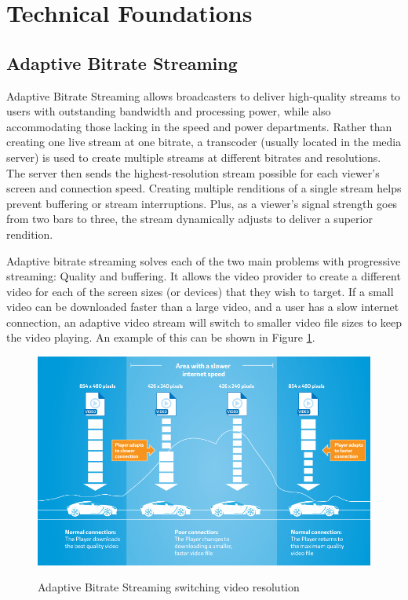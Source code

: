 \section{\textbf{Technical Foundations}}\label{sec:techfoundation}
\subsection{Adaptive Bitrate Streaming}

Adaptive Bitrate Streaming allows broadcasters to deliver high-quality streams to users with outstanding bandwidth and processing power, while also accommodating those lacking in the speed and power departments. Rather than creating one live stream at one bitrate, a transcoder (usually located in the media server) is used to create multiple streams at different bitrates and resolutions. The server then sends the highest-resolution stream possible for each viewer’s screen and connection speed. Creating multiple renditions of a single stream helps prevent buffering or stream interruptions. Plus, as a viewer’s signal strength goes from two bars to three, the stream dynamically adjusts to deliver a superior rendition. \cite{abs}

Adaptive bitrate streaming solves each of the two main problems with progressive streaming: Quality and buffering. It allows the video provider to create a different video for each of the screen sizes (or devices) that they wish to target. If a small video can be downloaded faster than a large video, and a user has a slow internet connection, an adaptive video stream will switch to smaller video file sizes to keep the video playing. An example of this can be shown in Figure \ref{fig:abs}.

\begin{figure}[!ht]
	\centering
\includegraphics[scale=0.29]{figures/abs.png}\\
	\caption{Adaptive Bitrate Streaming switching video resolution \cite{abs}}
	\label{fig:abs}
\end{figure}

